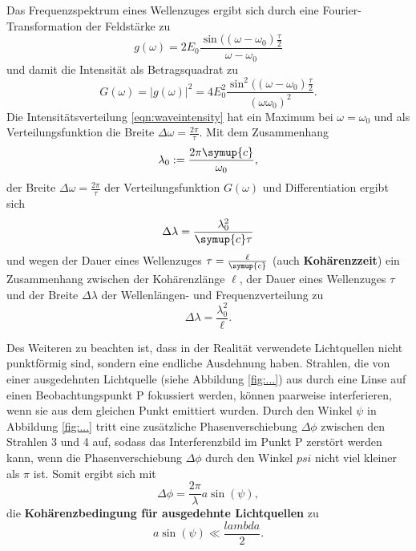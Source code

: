 Das Frequenzspektrum eines Wellenzuges ergibt sich durch eine Fourier-Transformation der 
Feldstärke zu 
\begin{equation}
	g(\omega) = 2E_0 \frac{\sin((\omega-\omega_0)\frac{\tau}{2}}{\omega-\omega_0}
\end{equation}
und damit die Intensität als Betragsquadrat zu
\begin{equation}
	\label{eqn:waveintensity}
	G(\omega) = |g(\omega)|^2 = 4E_0^2 \frac{\sin^2((\omega-\omega_0)\frac{\tau}{2}}{(\omega \omega_0)^2} \mathrm{.}
\end{equation}
Die Intensitätsverteilung \eqref{eqn:waveintensity} hat ein Maximum bei $\omega=\omega_0$ und 
als Verteilungsfunktion die Breite $\Delta \omega = \frac{2\pi}{\tau}$.
Mit dem Zusammenhang 
\begin{equation}
	\lambda_0 := \frac{2\pi \symup{c}}{\omega_0} \mathrm{,}
\end{equation}
der Breite $\Delta \omega = \frac{2\pi}{\tau}$ der Verteilungsfunktion $G(\omega)$ und 
Differentiation ergibt sich
\begin{equation}
	\Delta \lambda = \frac{\lambda_0^2}{\symup{c}\tau}
\end{equation}
und wegen der Dauer eines Wellenzuges $\tau = \frac{\ell}{\symup{c}}$ 
(auch \textbf{Kohärenzzeit}) ein Zusammenhang zwischen der Kohärenzlänge $\ell$, der Dauer
eines Wellenzuges $\tau$ und der Breite $\Delta \lambda$ der Wellenlängen- und Frequenzverteilung zu 
\begin{equation}
	\Delta \lambda = \frac{\lambda_0^2}{\ell} \mathrm{.}
\end{equation}

Des Weiteren zu beachten ist, dass in der Realität verwendete Lichtquellen nicht punktförmig 
sind, sondern eine endliche Ausdehnung haben. Strahlen, die von einer ausgedehnten Lichtquelle 
(siehe Abbildung \ref{fig:...}) aus durch eine Linse auf einen Beobachtungspunkt P fokussiert 
werden, können paarweise interferieren, wenn sie aus dem gleichen Punkt emittiert wurden. 
Durch den Winkel $\psi$ in Abbildung \ref{fig:...} tritt eine zusätzliche Phasenverschiebung 
$\Delta \phi$ zwischen den Strahlen 3 und 4 auf, sodass das Interferenzbild im Punkt P 
zerstört werden kann, wenn die Phasenverschiebung $\Delta \phi$ durch den Winkel $psi$ nicht 
viel kleiner als $\pi$ ist.
Somit ergibt sich mit 
\begin{equation}
	\Delta \phi = \frac{2\pi}{\lambda} a \sin(\psi) \mathrm{,}
\end{equation}
die \textbf{Kohärenzbedingung für ausgedehnte Lichtquellen} zu 
\begin{equation}
	a \sin(\psi) \ll \frac{lambda}{2} \mathrm{.}
\end{equation}












\cite{Anleitung}
